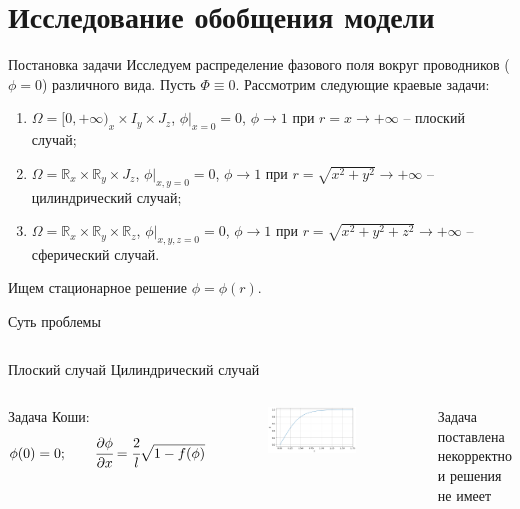 
\section{Исследование обобщения модели}

\begin{frame}{Постановка задачи}
Исследуем распределение фазового поля вокруг проводников ($\phi = 0$) различного вида. Пусть $\Phi \equiv 0$. Рассмотрим следующие краевые задачи:
\begin{enumerate}
	\item $\Omega = [0, +\infty)_x \times I_y \times J_z$, $\phi|_{x = 0} = 0$, $\phi \to 1$ при $r = x \to +\infty$ -- плоский случай;
	\item $\Omega = \mathbb{R}_x \times \mathbb{R}_y \times J_z$, $\phi|_{x, y = 0} = 0$, $\phi \to 1$ при $r = \sqrt{x^2 + y^2} \to +\infty$ -- \\ цилиндрический случай;
	\item $\Omega = \mathbb{R}_x \times \mathbb{R}_y \times \mathbb{R}_z$, $\phi|_{x, y, z = 0} = 0$, $\phi \to 1$ при $r = \sqrt{x^2 + y^2 + z^2} \to +\infty$ -- \\
	сферический случай.
\end{enumerate}
Ищем стационарное решение $\phi = \phi(r)$.
\end{frame}


\begin{frame}{Суть проблемы}
\begin{columns}
\centering
Плоский случай
\centering
Цилиндрический случай
\end{columns}
\vspace{0.5cm}
\begin{columns}
Задача Коши:
\vspace{-0.3cm}
$$\phi(0) = 0; \qquad \cfrac{\partial \phi}{\partial x} = \cfrac{2}{l} \sqrt{1 - f(\phi)}$$
\begin{figure}
	\includegraphics[width=\textwidth]{figures/result_volumes.png}
\end{figure}
\rule{0.4pt}{0.7\textheight}
\centering
Задача поставлена некорректно \\ и решения не имеет \cite{zipunova_higher_codimension}
\end{columns}
\end{frame}


